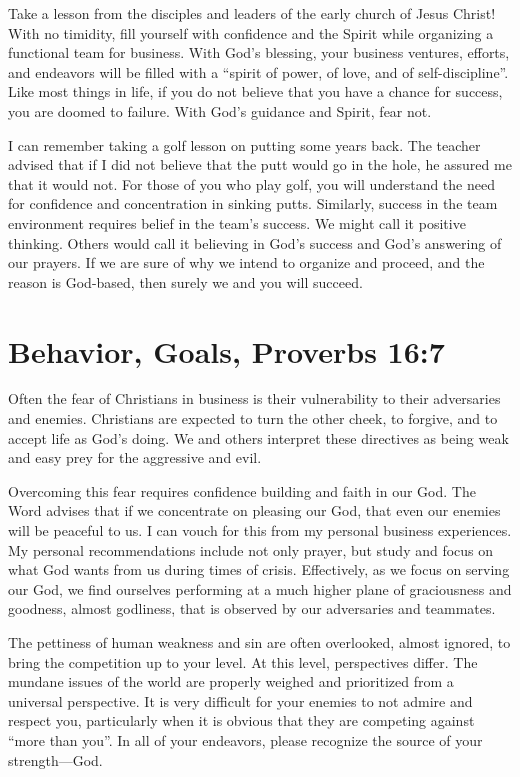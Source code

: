 \documentclass[12pt]{memoir}
\begin{document}
Take a lesson from the disciples and leaders of the early church of
Jesus Christ! With no timidity, fill yourself with confidence and
the Spirit while organizing a functional team for business. With God's
blessing, your business ventures, efforts, and endeavors will be filled
with a ``spirit of power, of love, and of self-discipline''. Like
most things in life, if you do not believe that you have a chance
for success, you are doomed to failure. With God's guidance and Spirit,
fear not.

I can remember taking a golf lesson on putting some years back. The
teacher advised that if I did not believe that the putt would go in
the hole, he assured me that it would not. For those of you who play
golf, you will understand the need for confidence and concentration
in sinking putts. Similarly, success in the team environment requires
belief in the team's success. We might call it positive thinking.
Others would call it believing in God's success and God's answering
of our prayers. If we are sure of why we intend to organize and proceed,
and the reason is God-based, then surely we and you will succeed.

\section[Behavior, Goals]{Behavior, Goals, Proverbs 16:7}

Often the fear of Christians in business is their vulnerability to
their adversaries and enemies. Christians are expected to turn the
other cheek, to forgive, and to accept life as God's doing. We and
others interpret these directives as being weak and easy prey for
the aggressive and evil.

Overcoming this fear requires confidence building and faith in our
God. The Word advises that if we concentrate on pleasing our God,
that even our enemies will be peaceful to us. I can vouch for
this from my personal business experiences. My personal recommendations
include not only prayer, but study and focus on what God wants from
us during times of crisis. Effectively, as we focus on serving our
God, we find ourselves performing at a much higher plane of graciousness
and goodness, almost godliness, that is observed by our adversaries
and teammates.

The pettiness of human weakness and sin are often overlooked, almost
ignored, to bring the competition up to your level. At this level,
perspectives differ. The mundane issues of the world are properly
weighed and prioritized from a universal perspective. It is very difficult
for your enemies to not admire and respect you, particularly when
it is obvious that they are competing against ``more than you''.
In all of your endeavors, please recognize the source of your strength---God.
\end{document}
